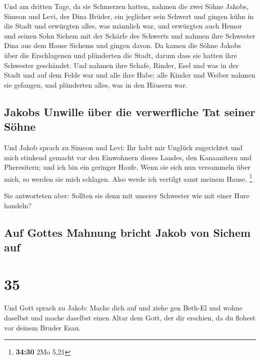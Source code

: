  Und am dritten Tage, da sie Schmerzen hatten, nahmen die
zwei Söhne Jakobs, Simeon und Levi, der Dina Brüder, ein jeglicher sein
Schwert und gingen kühn in die Stadt und erwürgten alles, was männlich
war,  und erwürgten auch Hemor und seinen Sohn Sichem mit
der Schärfe des Schwerts und nahmen ihre Schwester Dina aus dem Hause
Sichems und gingen davon.  Da kamen die Söhne Jakobs über
die Erschlagenen und plünderten die Stadt, darum dass sie hatten ihre
Schwester geschändet.  Und nahmen ihre Schafe, Rinder,
Esel und was in der Stadt und auf dem Felde war  und alle
ihre Habe; alle Kinder und Weiber nahmen sie gefangen, und plünderten
alles, was in den Häusern war.

\hypertarget{jakobs-unwille-uxfcber-die-verwerfliche-tat-seiner-suxf6hne}{%
\subsection{Jakobs Unwille über die verwerfliche Tat seiner
Söhne}\label{jakobs-unwille-uxfcber-die-verwerfliche-tat-seiner-suxf6hne}}

 Und Jakob sprach zu Simeon und Levi: Ihr habt mir
Unglück zugerichtet und mich stinkend gemacht vor den Einwohnern dieses
Landes, den Kanaanitern und Pheresitern; und ich bin ein geringer Haufe.
Wenn sie sich nun versammeln über mich, so werden sie mich schlagen.
Also werde ich vertilgt samt meinem Hause. \footnote{\textbf{34:30} 2Mo
  5,21}

 Sie antworteten aber: Sollten sie denn mit unserer
Schwester wie mit einer Hure handeln?

\hypertarget{auf-gottes-mahnung-bricht-jakob-von-sichem-auf}{%
\subsection{Auf Gottes Mahnung bricht Jakob von Sichem
auf}\label{auf-gottes-mahnung-bricht-jakob-von-sichem-auf}}

\hypertarget{section-34}{%
\section{35}\label{section-34}}

 Und Gott sprach zu Jakob: Mache dich auf und ziehe gen
Beth-El und wohne daselbst und mache daselbst einen Altar dem Gott, der
dir erschien, da du flohest vor deinem Bruder Esau.

